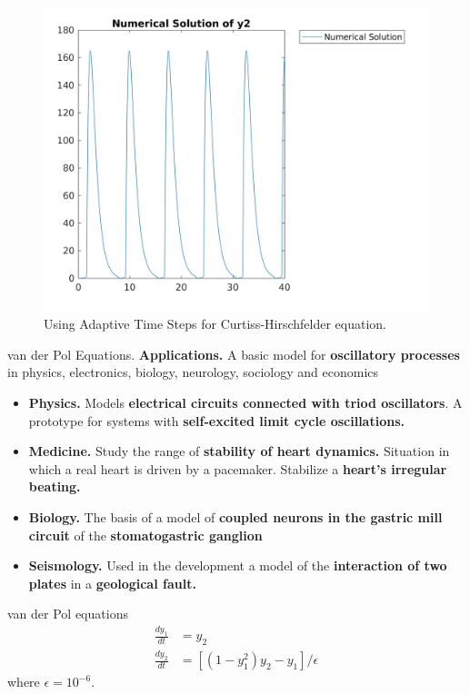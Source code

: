 \documentclass[9pt]{beamer}
\numberwithin{equation}{section}
\begin{document}
\begin{frame}
\begin{figure}
\centering
\includegraphics[scale=0.15]{ats_o3_y2}
\caption{Using Adaptive Time Steps for Curtiss-Hirschfelder equation.}
\end{figure}
\end{frame}

\begin{frame}{van der Pol Equations.}
\textbf{\textsf{Applications.}} A basic model for \textbf{oscillatory processes} in physics, electronics, biology, neurology, sociology and economics
\begin{itemize}
\item {\color{blue} \textbf{Physics.}} Models \textbf{electrical circuits connected with triod oscillators}. A prototype for systems with \textbf{self-excited limit cycle oscillations.}
\item {\color{blue} \textbf{Medicine.}} Study the range of \textbf{stability of heart dynamics.} Situation in which a real heart is driven by a pacemaker. Stabilize a \textbf{heart's irregular beating.}
\item {\color{blue} \textbf{Biology.}} The basis of a model of \textbf{coupled neurons in the gastric mill circuit} of the \textbf{stomatogastric ganglion}
\item {\color{blue} \textbf{Seismology.}} Used in the development a model of the \textbf{interaction of two plates} in a \textbf{geological fault.}
\end{itemize}
\begin{block}{van der Pol equations}
\begin{subequations}
\begin{align}
    \frac{dy_1}{dt}  &=  y_2
    \\
    \frac{dy_2}{dt}  &=  [ (1-y_1^2)y_2 - y_1 ] / \epsilon
\end{align}
\end{subequations}
where $\epsilon = 10^{-6}$.
\end{block}
\end{frame}
\end{document}
